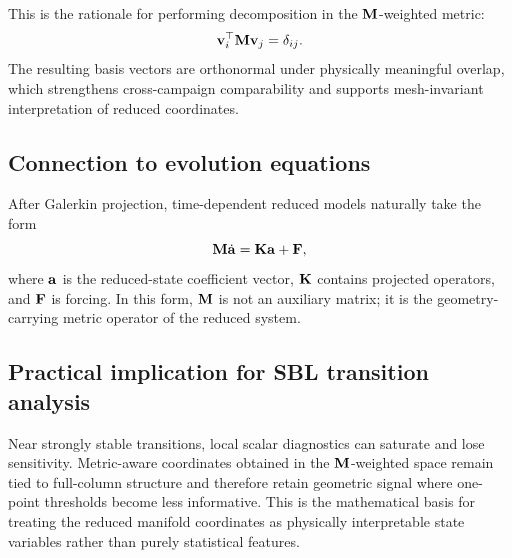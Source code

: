 This is the rationale for performing decomposition in the $\mathbf{M}$-weighted metric:
\begin{equation}
\mathbf{v}_i^\top \mathbf{M} \mathbf{v}_j = \delta_{ij}.
\end{equation}
The resulting basis vectors are orthonormal under physically meaningful overlap, which strengthens cross-campaign comparability and supports mesh-invariant interpretation of reduced coordinates.

\subsection{Connection to evolution equations}

After Galerkin projection, time-dependent reduced models naturally take the form
\begin{equation}
\mathbf{M}\dot{\mathbf{a}} = \mathbf{K}\mathbf{a} + \mathbf{F},
\end{equation}
where $\mathbf{a}$ is the reduced-state coefficient vector, $\mathbf{K}$ contains projected operators, and $\mathbf{F}$ is forcing. In this form, $\mathbf{M}$ is not an auxiliary matrix; it is the geometry-carrying metric operator of the reduced system.

\subsection{Practical implication for SBL transition analysis}

Near strongly stable transitions, local scalar diagnostics can saturate and lose sensitivity. Metric-aware coordinates obtained in the $\mathbf{M}$-weighted space remain tied to full-column structure and therefore retain geometric signal where one-point thresholds become less informative. This is the mathematical basis for treating the reduced manifold coordinates as physically interpretable state variables rather than purely statistical features.